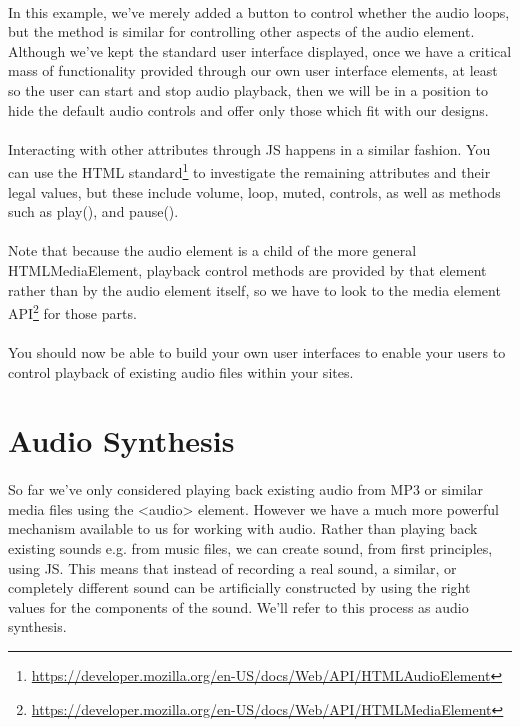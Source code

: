 \paragraph{} In this example, we’ve merely added a button to control whether the audio loops, but the method is similar for controlling other aspects of the audio element. Although we've kept the standard user interface displayed, once we have a critical mass of functionality provided through our own user interface elements, at least so the user can start and stop audio playback, then we will be in a position to hide the default audio controls and offer only those which fit with our designs.
\paragraph{} Interacting with other attributes through JS happens in a similar fashion. You can use the HTML standard\footnote{\url{https://developer.mozilla.org/en-US/docs/Web/API/HTMLAudioElement}} to investigate the remaining attributes and their legal values, but these include volume, loop, muted, controls, as well as methods such as play(), and pause().
\paragraph{} Note that because the audio element is a child of the more general HTMLMediaElement, playback control methods are provided by that element rather than by the audio element itself, so we have to look to the media element API\footnote{\url{https://developer.mozilla.org/en-US/docs/Web/API/HTMLMediaElement}} for those parts.
\paragraph{} You should now be able to build your own user interfaces to enable your users to control playback of existing audio files within your sites.


\section{Audio Synthesis}
\paragraph{} So far we've only considered playing back existing audio from MP3 or similar media files using the <audio> element. However we have a much more powerful mechanism available to us for working with audio. Rather than playing back existing sounds e.g. from music files, we can create sound, from first principles, using JS. This means that instead of recording a real sound, a similar, or completely different sound can be artificially constructed by using the right values for the components of the sound. We'll refer to this process as audio synthesis.
